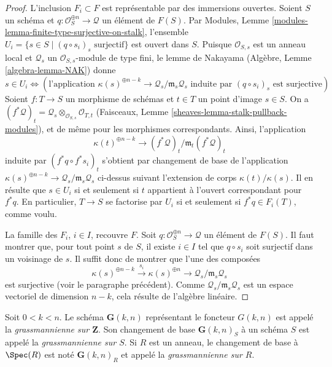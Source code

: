 \begin{proof}
\medskip\noindent
L'inclusion $F_i \subset F$ est représentable par des immersions ouvertes.
Soient $S$ un schéma et $q : \mathcal{O}_S^{\oplus n} \to \mathcal{Q}$
un élément de $F(S)$. Par Modules,
Lemme \ref{modules-lemma-finite-type-surjective-on-stalk}, l'ensemble
$U_i = \{s \in S \mid (q \circ s_i)_s\text{ surjectif}\}$ est ouvert
dans $S$. Puisque $\mathcal{O}_{S, s}$ est un anneau local et
$\mathcal{Q}_s$ un $\mathcal{O}_{S, s}$-module de type fini, le lemme de
Nakayama (Algèbre, Lemme \ref{algebra-lemma-NAK}) donne
$$
s \in U_i \Leftrightarrow
\left(
\text{l'application }
\kappa(s)^{\oplus n - k} \to \mathcal{Q}_s/\mathfrak m_s\mathcal{Q}_s
\text{ induite par }
(q \circ s_i)_s
\text{ est surjective}
\right)
$$
Soient $f : T \to S$ un morphisme de schémas et $t \in T$ un point
d'image $s \in S$. On a
$(f^*\mathcal{Q})_t =
\mathcal{Q}_s \otimes_{\mathcal{O}_{S, s}} \mathcal{O}_{T, t}$
(Faisceaux, Lemme \ref{sheaves-lemma-stalk-pullback-modules}), et de même
pour les morphismes correspondants. Ainsi, l'application
$$
\kappa(t)^{\oplus n - k} \to (f^*\mathcal{Q})_t/\mathfrak m_t(f^*\mathcal{Q})_t
$$
induite par $(f^*q \circ f^*s_i)_t$ s'obtient par changement de base de
l'application
$\kappa(s)^{\oplus n - k} \to \mathcal{Q}_s/\mathfrak m_s\mathcal{Q}_s$
ci-dessus suivant l'extension de corps $\kappa(t)/\kappa(s)$.
Il en résulte que $s \in U_i$ si et seulement si $t$ appartient à l'ouvert
correspondant pour $f^*q$. En particulier, $T \to S$ se factorise par
$U_i$ si et seulement si $f^*q \in F_i(T)$, comme voulu.

\medskip\noindent
La famille des $F_i$, $i \in I$, recouvre $F$.
Soit $q : \mathcal{O}_S^{\oplus n} \to \mathcal{Q}$ un élément de $F(S)$.
Il faut montrer que, pour tout point $s$ de $S$, il existe $i \in I$ tel
que $q \circ s_i$ soit surjectif dans un voisinage de $s$.
Il suffit donc de montrer que l'une des composées
$$
\kappa(s)^{\oplus n - k} \xrightarrow{s_i}
\kappa(s)^{\oplus n} \rightarrow
\mathcal{Q}_s/\mathfrak m_s\mathcal{Q}_s
$$
est surjective (voir le paragraphe précédent). Comme
$\mathcal{Q}_s/\mathfrak m_s\mathcal{Q}_s$ est un espace vectoriel de
dimension $n - k$, cela résulte de l'algèbre linéaire.
\end{proof}

\begin{definition}
\label{definition-grassmannian}
Soit $0 < k < n$. Le schéma $\mathbf{G}(k, n)$ représentant le foncteur
$G(k, n)$ est appelé la {\it grassmannienne sur $\mathbf{Z}$}.
Son changement de base $\mathbf{G}(k, n)_S$ à un schéma $S$ est appelé la
{\it grassmannienne sur $S$}. Si $R$ est un anneau, le changement de base
à $\Spec(R)$ est noté $\mathbf{G}(k, n)_R$ et appelé la
{\it grassmannienne sur $R$}.
\end{definition}

